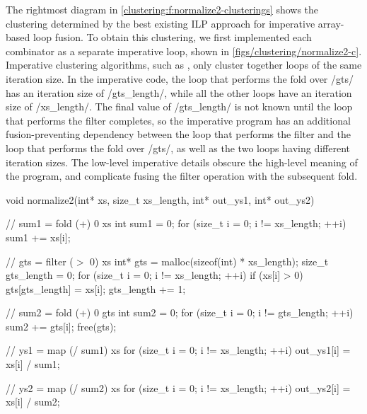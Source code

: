 The rightmost diagram in \cref{clustering:f:normalize2-clusterings} shows the clustering determined by the best existing ILP approach for imperative array-based loop fusion.
To obtain this clustering, we first implemented each combinator as a separate imperative loop, shown in \cref{figs/clustering/normalize2-c}.
Imperative clustering algorithms, such as \citet{megiddo1998optimal}, only cluster together loops of the same iteration size.
In the imperative code, the loop that performs the fold over \Hs/gts/ has an iteration size of \Hs/gts_length/, while all the other loops have an iteration size of \Hs/xs_length/.
The final value of \Hs/gts_length/ is not known until the loop that performs the filter completes, so the imperative program has an additional fusion-preventing dependency between the loop that performs the filter and the loop that performs the fold over \Hs/gts/, as well as the two loops having different iteration sizes.
The low-level imperative details obscure the high-level meaning of the program, and complicate fusing the filter operation with the subsequent fold.

\begin{listing-c}[float,label=figs/clustering/normalize2-c,caption=Unfused imperative implementation of \Hs/normalize2/]
void normalize2(int* xs, size_t xs_length, int* out_ys1, int* out_ys2)
{
    // sum1 = fold (+) 0 xs
    int sum1 = 0;
    for (size_t i = 0; i != xs_length; ++i) {
        sum1 += xs[i];
    }

    // gts = filter ($>$ 0) xs
    int* gts = malloc(sizeof(int) * xs_length);
    size_t gts_length = 0;
    for (size_t i = 0; i != xs_length; ++i) {
        if (xs[i] > 0) {
            gts[gts_length] = xs[i];
            gts_length += 1;
        }
    }

    // sum2 = fold (+) 0 gts
    int sum2 = 0;
    for (size_t i = 0; i != gts_length; ++i) {
        sum2 += gts[i];
    }
    free(gts);

    // ys1 = map (/ sum1) xs
    for (size_t i = 0; i != xs_length; ++i) {
        out_ys1[i] = xs[i] / sum1;
    }

    // ys2 = map (/ sum2) xs
    for (size_t i = 0; i != xs_length; ++i) {
        out_ys2[i] = xs[i] / sum2;
    }
}
\end{listing-c}

